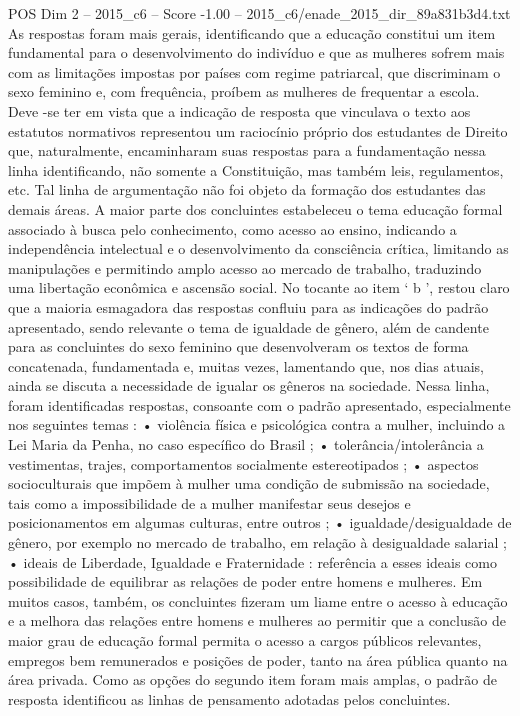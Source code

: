 \begin{textsample}{POS Dim 2 – 2015\_c6 – Score -1.00 – 2015\_c6/enade\_2015\_dir\_89a831b3d4.txt}
As respostas foram mais gerais, identificando que a educação constitui um item fundamental para o desenvolvimento do indivíduo e que as mulheres sofrem mais com as limitações impostas por países com regime patriarcal, que discriminam o sexo feminino e, com frequência, proíbem as mulheres de frequentar a escola.
Deve -se ter em vista que a indicação de resposta que vinculava o texto aos estatutos normativos representou um raciocínio próprio dos estudantes de Direito que, naturalmente, encaminharam suas respostas para a fundamentação nessa linha identificando, não somente a Constituição, mas também leis, regulamentos, etc.
Tal linha de argumentação não foi objeto da formação dos estudantes das demais áreas.
A maior parte dos concluintes estabeleceu o tema educação formal associado à busca pelo conhecimento, como acesso ao ensino, indicando a independência intelectual e o desenvolvimento da consciência crítica, limitando as manipulações e permitindo amplo acesso ao mercado de trabalho, traduzindo uma libertação econômica e ascensão social.
No tocante ao item ‘ b ’, restou claro que a maioria esmagadora das respostas confluiu para as indicações do padrão apresentado, sendo relevante o tema de igualdade de gênero, além de candente para as concluintes do sexo feminino que desenvolveram os textos de forma concatenada, fundamentada e, muitas vezes, lamentando que, nos dias atuais, ainda se discuta a necessidade de igualar os gêneros na sociedade.
Nessa linha, foram identificadas respostas, consoante com o padrão apresentado, especialmente nos seguintes temas : • violência física e psicológica contra a mulher, incluindo a Lei Maria da Penha, no caso específico do Brasil ; • tolerância/intolerância a vestimentas, trajes, comportamentos socialmente estereotipados ; • aspectos socioculturais que impõem à mulher uma condição de submissão na sociedade, tais como a impossibilidade de a mulher manifestar seus desejos e posicionamentos em algumas culturas, entre outros ; • igualdade/desigualdade de gênero, por exemplo no mercado de trabalho, em relação à desigualdade salarial ; • ideais de Liberdade, Igualdade e Fraternidade : referência a esses ideais como possibilidade de equilibrar as relações de poder entre homens e mulheres.
Em muitos casos, também, os concluintes fizeram um liame entre o acesso à educação e a melhora das relações entre homens e mulheres ao permitir que a conclusão de maior grau de educação formal permita o acesso a cargos públicos relevantes, empregos bem remunerados e posições de poder, tanto na área pública quanto na área privada.
Como as opções do segundo item foram mais amplas, o padrão de resposta identificou as linhas de pensamento adotadas pelos concluintes.

\end{textsample}
